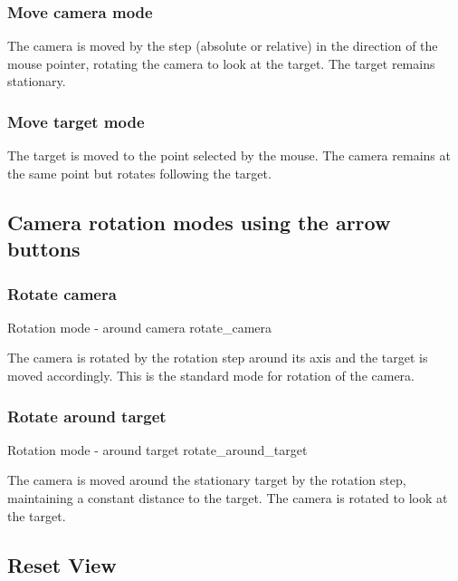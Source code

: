 \subsubsection{Move camera mode}\label{move-camera-mode-1}

The camera is moved by the step (absolute or relative) in the direction of the
mouse pointer, rotating the camera to look at the target. The target remains
stationary.

\subsubsection{Move target mode}\label{move-target-mode-1}

The target is moved to the point selected by the mouse. The camera remains at
the same point but rotates following the target.

\subsection{Camera rotation modes using the arrow
	buttons}\label{camera-rotation-modes-using-the-arrow-buttons}

\subsubsection{Rotate camera}\label{rotate-camera}

{Rotation mode - around camera}
{rotate_camera}

The camera is rotated by the rotation step around its axis and the target is
moved accordingly. This is the standard mode for rotation of the camera.

\subsubsection{Rotate around target}\label{rotate-around-target}

{Rotation mode - around target}
{rotate_around_target}

The camera is moved around the stationary target by the rotation step,
maintaining a constant distance to the target. The camera is rotated to look at
the target.

\subsection{Reset View}\label{reset-view}

